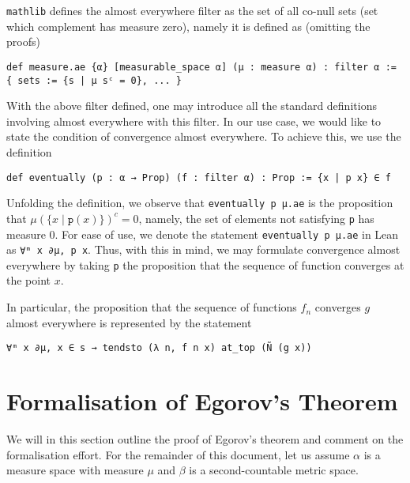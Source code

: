 \documentclass[]{article}
\theoremstyle{definition}
\begin{document}
\texttt{mathlib} defines the almost everywhere filter as the set of all 
co-null sets (set which complement has measure zero), namely it is defined as
(omitting the proofs)
\begin{verbatim}
def measure.ae {α} [measurable_space α] (μ : measure α) : filter α :=
{ sets := {s | μ sᶜ = 0}, ... }
\end{verbatim}
With the above filter defined, one may introduce all the standard definitions involving 
almost everywhere with this filter. In our use case, we would like to state the 
condition of convergence almost everywhere. To achieve this, we use the definition
\begin{verbatim}
def eventually (p : α → Prop) (f : filter α) : Prop := {x | p x} ∈ f
\end{verbatim}
Unfolding the definition, we observe that \texttt{eventually p μ.ae} is 
the proposition that \(\mu(\{x \mid \mathtt{p}(x)\})^c = 0\), namely, 
the set of elements not satisfying \texttt{p} has measure 0. For ease of use, 
we denote the statement \texttt{eventually p μ.ae} in Lean
as \texttt{∀ᵐ x ∂μ, p x}. Thus, with this in mind, we may formulate 
convergence almost everywhere by taking \texttt{p} the proposition that the 
sequence of function converges at the point \(x\).

In particular, the proposition that the sequence of functions \(f_n\) converges 
\(g\) almost everywhere is represented by the statement 
\begin{verbatim}
∀ᵐ x ∂μ, x ∈ s → tendsto (λ n, f n x) at_top (Ñ (g x))
\end{verbatim}

\section*{Formalisation of Egorov's Theorem}

We will in this section outline the proof of Egorov's theorem and comment on the formalisation effort.
For the remainder of this document, let us assume \(\alpha\) is a measure space with measure \(\mu\) 
and \(\beta\) is a second-countable metric space.
\end{document}

